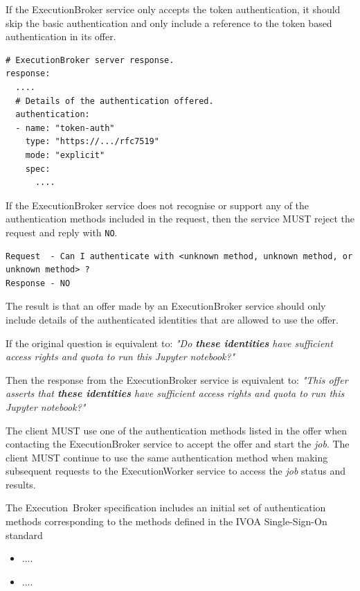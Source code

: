 \documentclass[11pt,a4paper]{ivoa}
\newcommand{\ivoa} {IVOA}
\newcommand{\execbrokerclass} {ExecutionBroker}
\newcommand{\execworkerclass} {ExecutionWorker}
\newcommand{\executionbroker} {Execution~Broker}
\newcommand{\jupyternotebook} {Jupyter notebook}
\newcommand{\codeword}[1] {\texttt{#1}}
\newcommand{\job} {\textit{job}}
\begin{document}
If the \execbrokerclass{} service only accepts the token authentication, it should
skip the basic authentication and only include a reference to the token
based authentication in its offer.

\begin{lstlisting}[]
# ExecutionBroker server response.
response:
  ....
  # Details of the authentication offered.
  authentication:
  - name: "token-auth"
    type: "https://.../rfc7519"
    mode: "explicit"
    spec:
      ....
\end{lstlisting}

If the \execbrokerclass{} service does not recognise or support any of the authentication methods
included in the request, then the service MUST reject the request and reply with \codeword{NO}.

\begin{lstlisting}[]
Request  - Can I authenticate with <unknown method, unknown method, or unknown method> ?
Response - NO
\end{lstlisting}

The result is that an offer made by an \execbrokerclass{} service should only include details
of the authenticated identities that are allowed to use the offer.

If the original question is equivalent to:
\textit{"Do \textbf{these identities} have sufficient access rights and quota to run this \jupyternotebook{}?"}

Then the response from the \execbrokerclass{} service is equivalent to:
\textit{"This offer asserts that \textbf{these identities} have sufficient access rights and quota to run this \jupyternotebook{}?"}

The client MUST use one of the authentication methods listed in the offer when
contacting the \execbrokerclass{} service to accept the offer and start the \job{}.
The client MUST continue to use the same authentication method when making subsequent
requests to the \execworkerclass{} service to access the \job{} status and results.

The \executionbroker{} specification includes an initial set of authentication methods
corresponding to the methods defined in the
\ivoa{} Single-Sign-On standard\citep{2017ivoa.spec.0524T}

\begin{itemize}
    \item ....
    \item ....
\end{itemize}
\end{document}
